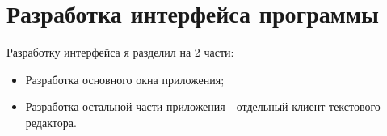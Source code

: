 \section{Разработка интерфейса программы}

Разработку интерфейса я разделил на 2 части:

\begin{itemize}
  \item Разработка основного окна приложения;
  \item Разработка остальной части приложения - отдельный клиент текстового редактора.
\end{itemize}

